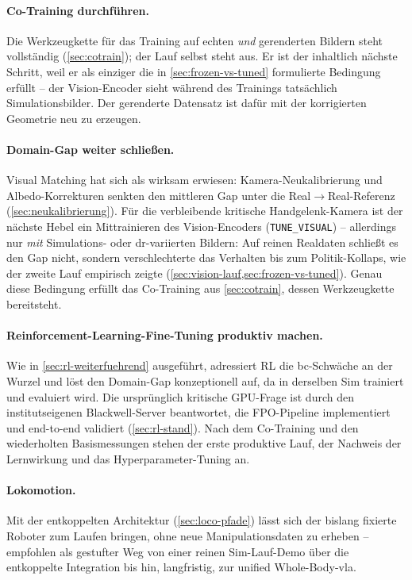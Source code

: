 \paragraph{Co-Training durchführen.}
Die Werkzeugkette für das Training auf echten \emph{und} gerenderten Bildern
steht vollständig (\cref{sec:cotrain}); der Lauf selbst steht aus. Er ist der
inhaltlich nächste Schritt, weil er als einziger die in
\cref{sec:frozen-vs-tuned} formulierte Bedingung erfüllt -- der Vision-Encoder
sieht während des Trainings tatsächlich Simulationsbilder. Der gerenderte
Datensatz ist dafür mit der korrigierten Geometrie neu zu erzeugen.

\paragraph{Domain-Gap weiter schließen.}
Visual Matching hat sich als wirksam erwiesen: Kamera-Neukalibrierung und
Albedo-Korrekturen senkten den mittleren Gap unter die Real$\to$Real-Referenz
(\cref{sec:neukalibrierung}). Für die verbleibende kritische Handgelenk-Kamera
ist der nächste Hebel ein Mittrainieren des Vision-Encoders
(\texttt{TUNE\_VISUAL}) -- allerdings nur \emph{mit} Simulations- oder
\acs{dr}-variierten Bildern: Auf reinen Realdaten schließt es den Gap nicht,
sondern verschlechterte das Verhalten bis zum Politik-Kollaps, wie der zweite
Lauf empirisch zeigte (\cref{sec:vision-lauf,sec:frozen-vs-tuned}). Genau diese
Bedingung erfüllt das Co-Training aus \cref{sec:cotrain}, dessen Werkzeugkette
bereitsteht.

\paragraph{Reinforcement-Learning-Fine-Tuning produktiv machen.}
Wie in \cref{sec:rl-weiterfuehrend} ausgeführt, adressiert RL die \ac{bc}-Schwäche
an der Wurzel und löst den Domain-Gap konzeptionell auf, da in derselben Sim
trainiert und evaluiert wird. Die ursprünglich kritische GPU-Frage ist durch den
institutseigenen Blackwell-Server beantwortet, die FPO-Pipeline implementiert
und end-to-end validiert (\cref{sec:rl-stand}). Nach dem Co-Training und den
wiederholten Basismessungen stehen der erste produktive Lauf, der Nachweis der
Lernwirkung und das Hyperparameter-Tuning an.

\paragraph{Lokomotion.}
Mit der entkoppelten Architektur (\cref{sec:loco-pfade}) lässt sich der bislang
fixierte Roboter zum Laufen bringen, ohne neue Manipulationsdaten zu erheben --
empfohlen als gestufter Weg von einer reinen Sim-Lauf-Demo über die entkoppelte
Integration bis hin, langfristig, zur unified Whole-Body-\ac{vla}.

